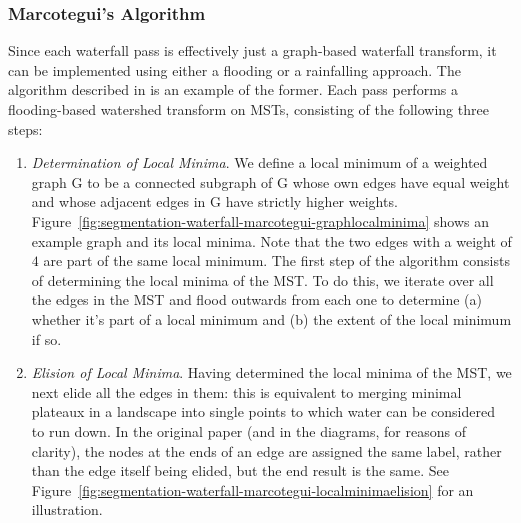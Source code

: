 \subsubsection{Marcotegui's Algorithm}

Since each waterfall pass is effectively just a graph-based waterfall transform, it can be implemented using either a flooding or a rainfalling approach. The algorithm described in \cite{marcotegui05} is an example of the former. Each pass performs a flooding-based watershed transform on MSTs, consisting of the following three steps:

\begin{enumerate}

\item \emph{Determination of Local Minima}. We define a local minimum of a weighted graph G to be a connected subgraph of G whose own edges have equal weight and whose adjacent edges in G have strictly higher weights. Figure~\ref{fig:segmentation-waterfall-marcotegui-graphlocalminima} shows an example graph and its local minima. Note that the two edges with a weight of $4$ are part of the same local minimum. The first step of the algorithm consists of determining the local minima of the MST. To do this, we iterate over all the edges in the MST and flood outwards from each one to determine (a) whether it's part of a local minimum and (b) the extent of the local minimum if so.


\item \emph{Elision of Local Minima}. Having determined the local minima of the MST, we next elide all the edges in them: this is equivalent to merging minimal plateaux in a landscape into single points to which water can be considered to run down. In the original paper (and in the diagrams, for reasons of clarity), the nodes at the ends of an edge are assigned the same label, rather than the edge itself being elided, but the end result is the same. See Figure~\ref{fig:segmentation-waterfall-marcotegui-localminimaelision} for an illustration.



\end{enumerate}
